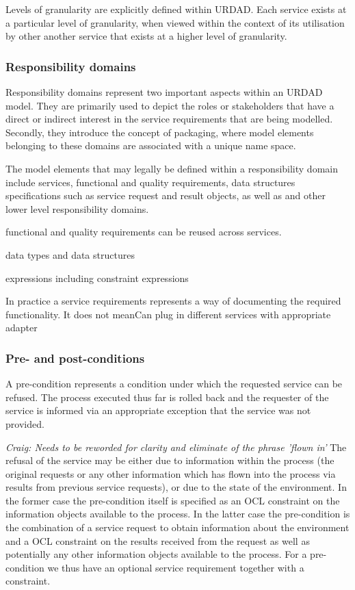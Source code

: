 
Levels of granularity are explicitly defined within URDAD. Each service exists at a particular level of granularity, when viewed within the context of its utilisation by other another service that exists at a higher level of granularity.

\subsubsection{Responsibility domains}

Responsibility domains represent two important aspects within an URDAD model. They are primarily used to depict the roles or stakeholders that have  a direct or indirect interest in the service requirements that are being modelled. Secondly, they introduce the concept of packaging, where model elements belonging to these domains are associated with a unique name space. 

The model elements that may legally be defined within a responsibility domain include services, functional and quality requirements, data structures specifications such as service request and result objects, as well as and other lower level responsibility domains.







functional and quality requirements can be reused across services. 

data types and data structures

expressions including constraint expressions

 In practice a service requirements represents a way of documenting the required functionality. It does not meanCan plug in different services with appropriate adapter


\subsubsection{Pre- and post-conditions}

A pre-condition represents a condition under which the requested service can be refused. The process executed thus far is rolled back and the requester of the service is informed via an appropriate exception that the service was not provided. 

{\em Craig: Needs to be reworded for clarity and eliminate of the phrase 'flown in'}
The refusal of the service may be either due to information within the process (the original requests or any other information which has flown into the process via results from previous service requests), or due to the state of the environment. In the former case the pre-condition itself is specified as an OCL constraint on the information objects available to the process. In the latter case the pre-condition is the combination of a service request to obtain information about the environment and a OCL constraint on the results received from the request as well as potentially any other information objects available to the process. For a pre-condition we thus have an optional service requirement together with a constraint.

